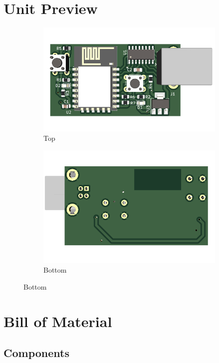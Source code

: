\documentclass[a4paper,12pt,oneside,pdflatex,italian,final,twocolumn]{article}
\begin{document}
	\section{Unit Preview}
	\begin{figure}[h]
		\centering
		\begin{subfigure}{0.45\textwidth}
			\includegraphics[width=\textwidth]{images/top.png}
			\caption{Top}
		\end{subfigure}
		\begin{subfigure}{0.45\textwidth}
			\includegraphics[width=\textwidth]{images/bottom.png}
			\caption{Bottom}
		\end{subfigure}
	\end{figure}

	\section{Bill of Material}

	\subsection{Components}
\end{document}
